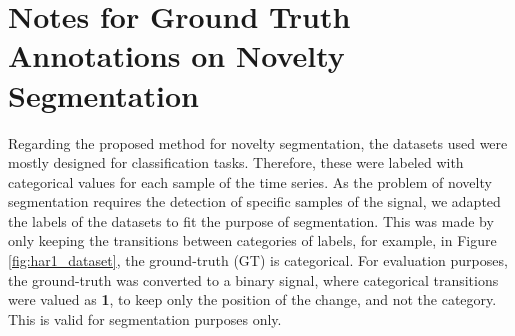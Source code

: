 \section{Notes for Ground Truth Annotations on Novelty Segmentation}

Regarding the proposed method for novelty segmentation, the datasets used were mostly designed for classification tasks. Therefore, these were labeled with categorical values for each sample of the time series. As the problem of novelty segmentation requires the detection of specific samples of the signal, we adapted the labels of the datasets to fit the purpose of segmentation. This was made by only keeping the transitions between categories of labels, for example, in Figure \ref{fig:har1_dataset}, the ground-truth (GT) is categorical. For evaluation purposes, the ground-truth was converted to a binary signal, where categorical transitions were valued as \textbf{1}, to keep only the position of the change, and not the category. This is valid for segmentation purposes only.